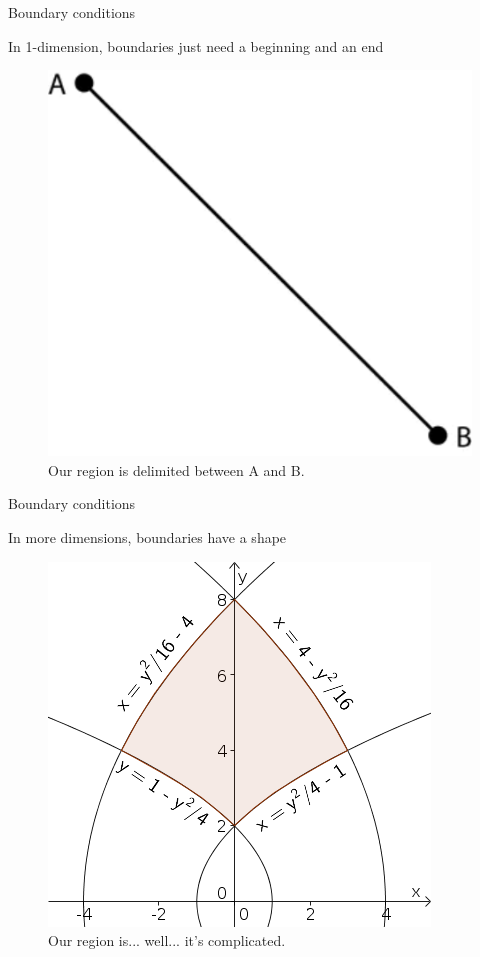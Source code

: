 \documentclass{beamer}
\begin{document}
  \begin{frame}{Boundary conditions}

    In 1-dimension, boundaries just need a beginning and an end

    \begin{figure}
    \includegraphics[scale=0.7]{img/1d-region.png}
    \caption{\label{fig:1dBoundary}Our region is delimited between A and B.}
    \end{figure}

  \end{frame}

  \begin{frame}{Boundary conditions}

    In more dimensions, boundaries have a shape

    \begin{figure}
    \includegraphics[scale=0.5]{img/2d-region.png}
    \caption{\label{fig:2dBoundary}Our region is... well... it's complicated.}
    \end{figure}

  \end{frame}
\end{document}
